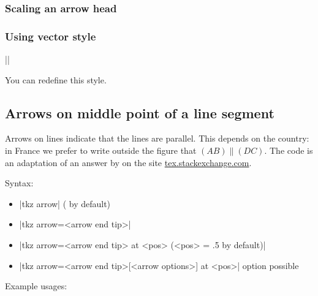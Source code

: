 \subsubsection{Scaling an arrow head}

\begin{tkzexample}[latex=6cm,small]
\end{tkzexample}

\subsubsection{Using vector style}
||

You can redefine this style.
\begin{tkzexample}[latex=6cm,small]
\end{tkzexample}
  
\subsection{Arrows on  middle point of a line segment}

Arrows on lines indicate that the lines are parallel. This depends on the country: in France we prefer to write outside the figure that $(AB) \parallel (DC)$. The code is an adaptation of an answer by  on the site \href{https://tex.stackexchange.com/questions/632596/how-to-manage-argument-pattern-keys-and-subways}{tex.stackexchange.com}.

\medskip
 Syntax: \\

 \begin{itemize}
\item |tkz arrow| ( by default)
\item |tkz arrow=<arrow end tip>|
\item |tkz arrow=<arrow end tip> at <pos> (<pos> = .5 by default)|
\item |tkz arrow={<arrow end tip>[<arrow options>] at <pos>}| option possible 
 \end{itemize}

Example usages: \\

